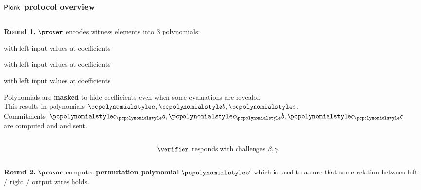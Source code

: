 \documentclass[aspectratio=169]{beamer}
\renewcommand{\emph}[1]{\textbf{#1}}
\begin{document}
\begin{frame}
  \frametitle{$\textnormal{\textsf{Plonk}}$ protocol overview}
  \begin{columns}
    \begin{column}{0.5\linewidth}
      \textbf{Round 1.} $\prover$ encodes witness elements into $3$ polynomials:
      \begin{compactitem}
      \item {} with left input values at coefficients
      \item {} with left input values at coefficients
      \item {} with left input values at coefficients
      \end{compactitem}
      Polynomials are \emph{masked} to hide coefficients even when some
      evaluations are revealed\\
      This results in polynomials $\p{a}, \p{b}, \p{c}$. \\
      Commitments $\cp{a}, \cp{b}, \cp{c}$ are computed and and sent.\pause
  \end{column}
  \begin{column}{0.5\linewidth}
    \pause
    \end{column}
  \end{columns}
  \begin{columns}
    \begin{column}{0.5\linewidth}
    \end{column}
    \begin{column}{0.5\linewidth}
      $\verifier$ responds with challenges $\beta, \gamma$.\pause
    \end{column}
  \end{columns}
    \begin{columns}
    \begin{column}{0.5\linewidth}
      \textbf{Round 2.} $\prover$ computes \emph{permutation polynomial}
      $\p{z'}$ which is used to assure that some relation between left / right /
      output wires holds.\\

\end{column}
\end{columns}
\end{frame}
\end{document}
